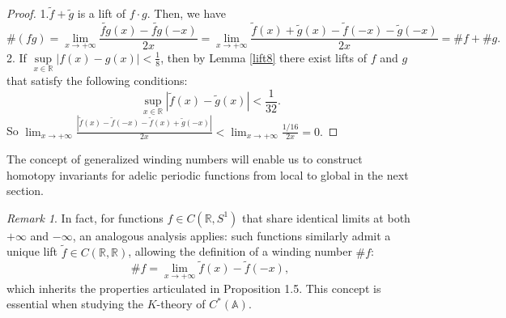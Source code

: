\documentclass[11pt]{article}
\theoremstyle{remark}
\newtheorem{remark}{Remark}[section] %
\begin{document}
\begin{proof}
    1.\( \tilde{f} + \tilde{g} \) is a lift of \( f \cdot  g \). Then, we have
    $$
    \#(fg)=\lim_{x\to+\infty}\frac{\widetilde{fg}(x)-\widetilde{fg}(-x)}{2x}=\lim_{x\to+\infty}\frac{\tilde{f}(x)+\tilde{g}(x)-\tilde{f}(-x)-\tilde{g}(-x)}{2x}=\#f+\#g.
    $$
    2.  If \( \sup\limits_{x \in \mathbb{R}} |f(x) - g(x)| < \frac{1}{8} \), then by Lemma \ref{lift8} there exist lifts of \( f \) and \( g \) that satisfy the following conditions:
    $$
     \sup\limits_{x \in \mathbb{R}} |\tilde{f}(x) - \tilde{g}(x)| < \frac{1}{32} .
    $$
So $\lim_{x\to+\infty}\frac{|\tilde{f}(x)-\tilde{f}(-x)-\tilde{f}(x)+\tilde{g}(-x)|}{2x}<\lim_{x\to+\infty}\frac{1/16}{2x}=0.$
\end{proof}
The concept of generalized winding numbers will enable us to construct homotopy invariants for adelic periodic functions from local to global in the next section. 
\begin{remark}\label{rem}
In fact, for functions \( f \in C(\mathbb{R}, S^1) \) that share identical limits at both \( +\infty \) and \( -\infty \), an analogous analysis applies: such functions similarly admit a unique lift \( \tilde{f} \in C(\mathbb{R}, \mathbb{R}) \), allowing the definition of a winding number \( \#f \):
    \begin{equation}
        \#f=\lim_{x\to+\infty}\tilde{f}(x)-\tilde{f}(-x),
    \end{equation}
which inherits the properties articulated in Proposition 1.5. This concept is essential when studying the $K$-theory of \(C^*(\mathbb{A})\).

\end{remark}
\end{document}
